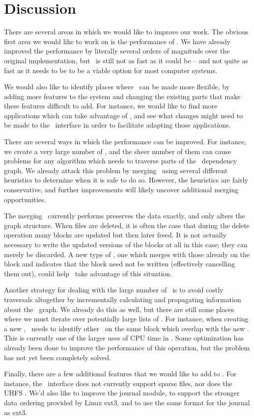 \section {Discussion}
\label{sec:discussion}

There are several areas in which we would like to improve our work. The obvious
first area we would like to work on is the performance of \Kudos. We have
already improved the performance by literally several orders of magnitude over
the original implementation, but \Kudos\ is still not as fast as it could be --
and not quite as fast as it needs to be to be a viable option for most computer
systems.

We would also like to identify places where \Kudos\ can be made more flexible,
by adding more features to the system and changing the existing parts that make
these features difficult to add. For instance, we would like to find more
applications which can take advantage of \opgroups, and see what changes might
need to be made to the \opgroup\ interface in order to facilitate adapting those
applications.

There are several ways in which the performance can be improved. For instance,
we create a very large number of \chdescs, and the sheer number of them can
cause problems for any algorithm which needs to traverse parts of the \chdesc\
dependency graph. We already attack this problem by merging \chdescs\ using
several different heuristics to determine when it is safe to do so. However, the
heuristics are fairly conservative, and further improvements will likely uncover
additional merging opportunities.

The merging \Kudos\ currently performs preserves the data exactly, and only
alters the graph structure. When files are deleted, it is often the case that
during the delete operation many blocks are updated but then later freed. It is
not actually necessary to write the updated versions of the blocks at all in
this case; they can merely be discarded. A new type of \chdesc, one which merges
with those already on the block and indicates that the block need not be written
(effectively cancelling them out), could help \Kudos\ take advantage of this
situation.

Another strategy for dealing with the large number of \chdescs\ is to avoid
costly traversals altogether by incrementally calculating and propagating
information about the \chdesc\ graph. We already do this as well, but there are
still some places where we must iterate over potentially large lists of
\chdescs. For instance, when creating a new \chdesc, \Kudos\ needs to identify
other \chdescs\ on the same block which overlap with the new \chdesc. This is
currently one of the larger uses of CPU time in \Kudos. Some optimization has
already been done to improve the performance of this operation, but the problem
has not yet been completely solved.

Finally, there are a few additional features that we would like to add to
\Kudos. For instance, the \LFS\ interface does not currently support sparse
files, nor does the UHFS \module. We'd also like to improve the journal module,
to support the stronger data ordering provided by Linux ext3, and to use the
same format for the journal as ext3.
